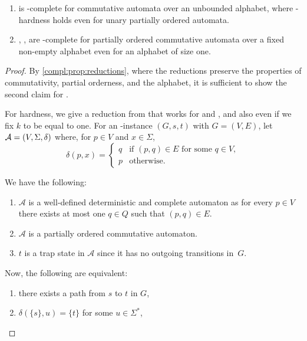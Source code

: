 \begin{theorem}\label{thm:SF-ST-comm}
	\begin{enumerate}		
		\item \SFS is \LOGSPACE-complete for commutative automata over an unbounded alphabet, where \LOGSPACE-hardness holds even for unary partially ordered automata.
		
		\item \ST, \DST, \DFAINT are \LOGSPACE-complete for partially ordered commutative automata over a fixed non-empty alphabet
		even for an alphabet of size one.
	\end{enumerate}
\end{theorem}
\begin{proof}
	By \cref{compl:prop:reductions},
	where the reductions preserve
	the properties of commutativity, partial orderness,
	and the alphabet,
	it is sufficient to show the second claim for \ST.	
	
	For hardness, we give a reduction from \ONEDAGST that works for \SFS 
	and \ST, and also even if we fix $k$ to be equal to one. 
	For an \ONEDAG-instance $(G, s, t)$ with $G = (V,E)$,
	let $\mathcal A = (V, \Sigma, \delta)$
	where, for $p \in V$ and $x \in \Sigma$, 
	\[
	\delta(p, x) = \begin{cases}
		q & \text{if } (p,q) \in E \text{ for some } q\in V, \\
		p & \text{otherwise.}		
	\end{cases}
	\]
	
	We have the following:	
	\begin{enumerate}
	\item $\mathcal A$ is a well-defined deterministic and complete automaton
	as for every $p \in V$ there exists at most one $q \in Q$ such that $(p,q) \in E$.
	
	\item $\mathcal A$ is a partially ordered commutative automaton.
		
	\item $t$ is a trap state in $\mathcal A$ since it has no outgoing transitions in~$G$.
	\end{enumerate}

	Now, the following are equivalent:
	\begin{enumerate}
		\item there exists a path from $s$ to $t$ in $G$,
		
		\item $\delta(\{s\}, u) = \{t\}$ for some $u \in \Sigma^*$,
		

\end{enumerate}
\end{proof}
